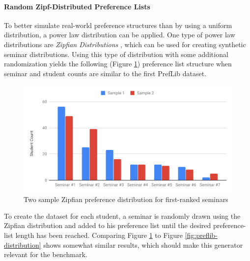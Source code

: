 \paragraph{Random Zipf-Distributed Preference Lists}
To better simulate real-world preference structures than by using a uniform distribution, a power law distribution can be applied. One type of power law distributions are \emph{Zipfian Distributions} \cite{Zipf}, which can be used for creating synthetic seminar distributions. Using this type of distribution with some additional randomization yields the following (Figure \ref{fig:zipfian-distribution}) preference list structure when seminar and student counts are similar to the first PrefLib dataset.

  \begin{figure}[h!]
    \centering
    \includegraphics[width=0.6\linewidth]{assets/plots/zipfian-distr.pdf}
    \caption{Two sample Zipfian preference distribution for first-ranked seminars}
    \label{fig:zipfian-distribution}
\end{figure}

To create the dataset for each student, a seminar is randomly drawn using the Zipfian distribution and added to his preference list until the desired preference-list length has been reached. Comparing Figure \ref{fig:zipfian-distribution} to Figure \ref{fig:preflib-distribution} shows somewhat similar results, which should make this generator relevant for the benchmark. 

